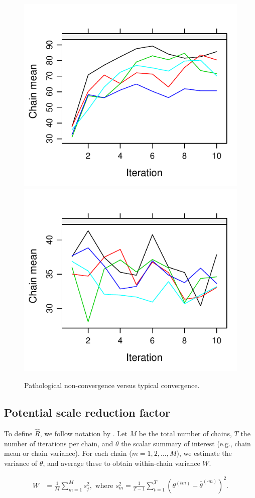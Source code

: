 \documentclass[Royal,times,sageh]{sagej}
\begin{document}
\begin{figure}

{\centering \includegraphics[width=.49\linewidth]{manuscript_files/figure-latex/unnamed-chunk-2-1} \includegraphics[width=.49\linewidth]{manuscript_files/figure-latex/unnamed-chunk-2-2} 

}

\caption{Pathological non-convergence versus typical convergence.}\label{fig:unnamed-chunk-2}
\end{figure}

\hypertarget{potential-scale-reduction-factor}{%
\subsection{Potential scale reduction
factor}\label{potential-scale-reduction-factor}}

To define \(\widehat{R}\), we follow notation by \citep[p.~5]{veht19}.
Let \(M\) be the total number of chains, \(T\) the number of iterations
per chain, and \(\theta\) the scalar summary of interest (e.g., chain
mean or chain variance). For each chain (\(m = 1, 2, \dots, M\)), we
estimate the variance of \(\theta\), and average these to obtain
within-chain variance \(W\).

\begin{align*}
W&=\frac{1}{M} \sum_{m=1}^{M} s_{j}^{2},  \text { where } s_{m}^{2}=\frac{1}{T-1} \sum_{t=1}^{T}\left(\theta^{(t m)}-\bar{\theta}^{(\cdot m)}\right)^{2}. 
\end{align*}
\end{document}
